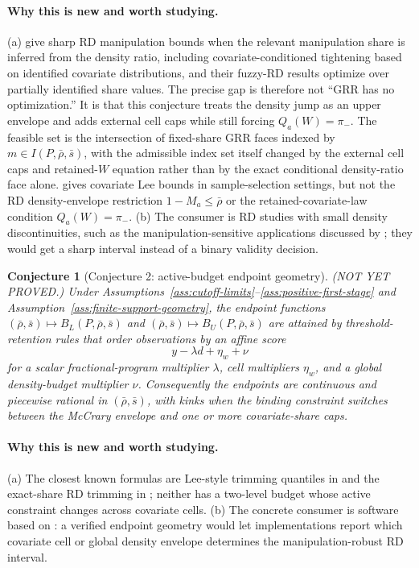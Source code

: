 \documentclass[11pt]{article}
\theoremstyle{definition}
\theoremstyle{plain}
\newtheorem{conjecture}{Conjecture}
\theoremstyle{remark}
\begin{document}
\paragraph{Why this is new and worth studying.}
(a) \citet{GerardRokkanenRothe2020} give sharp RD manipulation bounds when the relevant
manipulation share is inferred from the density ratio, including covariate-conditioned
tightening based on identified covariate distributions, and their fuzzy-RD results optimize
over partially identified share values.  The precise gap is therefore not ``GRR has no
optimization.''  It is that this conjecture treats the density jump as an upper envelope
and adds external cell caps while still forcing \(Q_a(W)=\pi_-\).  The feasible set is the
intersection of fixed-share GRR faces indexed by \(m\in I(P,\bar\rho,\bar s)\), with the
admissible index set itself changed by the external cell caps and retained-\(W\) equation
rather than by the exact conditional density-ratio face alone.  \citet{Semenova2025} gives covariate Lee bounds
in sample-selection settings, but not the RD density-envelope restriction
\(1-M_a\le\bar\rho\) or the retained-covariate-law condition \(Q_a(W)=\pi_-\).  (b) The
consumer is RD studies with small density discontinuities, such as the manipulation-sensitive
applications discussed by \citet{ChoiLee2023}; they would get a sharp interval instead of
a binary validity decision.

\begin{conjecture}[Conjecture 2: active-budget endpoint geometry]\label{conj:endpoint-geometry}
(NOT YET PROVED.)  Under Assumptions~\ref{ass:cutoff-limits}--\ref{ass:positive-first-stage}
and Assumption~\ref{ass:finite-support-geometry}, the endpoint functions
\((\bar\rho,\bar s)\mapsto B_L(P,\bar\rho,\bar s)\) and
\((\bar\rho,\bar s)\mapsto B_U(P,\bar\rho,\bar s)\) are attained by threshold-retention
rules that order observations by an affine score
\[
  y-\lambda d+\eta_w+\nu
\]
for a scalar fractional-program multiplier \(\lambda\), cell multipliers \(\eta_w\), and
a global density-budget multiplier \(\nu\).  Consequently the endpoints are continuous
and piecewise rational in \((\bar\rho,\bar s)\), with kinks when the binding constraint
switches between the McCrary envelope and one or more covariate-share caps.
\end{conjecture}

\paragraph{Why this is new and worth studying.}
(a) The closest known formulas are Lee-style trimming quantiles in \citet{Lee2009} and the
exact-share RD trimming in \citet{GerardRokkanenRothe2020}; neither has a two-level budget
whose active constraint changes across covariate cells.  (b) The concrete consumer is
software based on \citet{CattaneoJanssonMa2020}: a verified endpoint geometry would let
implementations report which covariate cell or global density envelope determines the
manipulation-robust RD interval.
\end{document}
